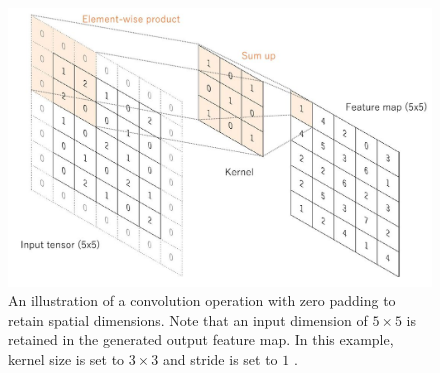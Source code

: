 \begin{figure}[H]
        \begin{center}
	    \includegraphics[scale=0.60]{images/Fundamentals/ConvolutionZeroPadding.JPG}
	    \caption[A Convolution Operation With Zero Padding.]{An illustration of a convolution operation with zero padding to retain spatial dimensions. Note that an input dimension of $5 \times 5$ is retained in the generated output feature map. In this example, kernel size is set to $3 \times 3$ and stride is set to $1$ \cite{articleCNNs}.}
	    \label{fig:ConvolutionZeroPadding}
	    \end{center}
\end{figure}


